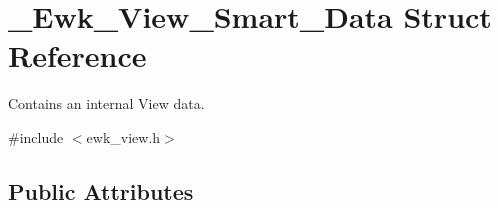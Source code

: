 \hypertarget{struct__Ewk__View__Smart__Data}{\section{\+\_\+\+Ewk\+\_\+\+View\+\_\+\+Smart\+\_\+\+Data Struct Reference}
\label{struct__Ewk__View__Smart__Data}
}


Contains an internal View data.  




{\ttfamily \#include $<$ewk\+\_\+view.\+h$>$}

\subsection*{Public Attributes}
